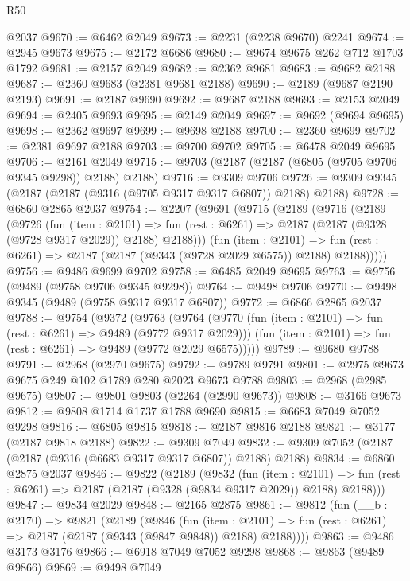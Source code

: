 \begin{lexlean}{R50}
\begin{coremodule}
    @2037
@9670 := @6462 @2049
@9673 := @2231 (@2238 @9670) @2241
@9674 := @2945 @9673
@9675 := @2172 @6686
@9680 := @9674 @9675 @262 @712 @1703 @1792
@9681 := @2157 @2049
@9682 := @2362 @9681
@9683 := @9682 @2188
@9687 := @2360 @9683 (@2381 @9681 @2188)
@9690 := @2189 (@9687 @2190 @2193)
@9691 := @2187 @9690
@9692 := @9687 @2188
@9693 := @2153 @2049
@9694 := @2405 @9693
@9695 := @2149 @2049
@9697 := @9692 (@9694 @9695)
@9698 := @2362 @9697
@9699 := @9698 @2188
@9700 := @2360 @9699
@9702 := @2381 @9697 @2188
@9703 := @9700 @9702
@9705 := @6478 @2049 @9695
@9706 := @2161 @2049
@9715 := @9703 (@2187 (@2187 (@6805 (@9705 @9706 @9345 @9298)) @2188) @2188)
@9716 := @9309 @9706
@9726 := @9309 @9345 (@2187 (@2187 (@9316 (@9705 @9317 @9317 @6807)) @2188) @2188)
@9728 := @6860 @2865 @2037
@9754 := @2207
    (@9691
      (@9715
        (@2189
          (@9716
            (@2189
              (@9726
                (fun (item : @2101) =>
                fun (rest : @6261) => @2187 (@2187 (@9328 (@9728 @9317 @2029)) @2188) @2188)))
            (fun (item : @2101) =>
            fun (rest : @6261) => @2187 (@2187 (@9343 (@9728 @2029 @6575)) @2188) @2188)))))
@9756 := @9486 @9699 @9702
@9758 := @6485 @2049 @9695
@9763 := @9756 (@9489 (@9758 @9706 @9345 @9298))
@9764 := @9498 @9706
@9770 := @9498 @9345 (@9489 (@9758 @9317 @9317 @6807))
@9772 := @6866 @2865 @2037
@9788 := @9754
    (@9372
      (@9763
        (@9764
          (@9770 (fun (item : @2101) => fun (rest : @6261) => @9489 (@9772 @9317 @2029)))
          (fun (item : @2101) => fun (rest : @6261) => @9489 (@9772 @2029 @6575)))))
@9789 := @9680 @9788
@9791 := @2968 (@2970 @9675)
@9792 := @9789 @9791
@9801 := @2975 @9673 @9675 @249 @102 @1789 @280 @2023 @9673 @9788
@9803 := @2968 (@2985 @9675)
@9807 := @9801 @9803 (@2264 (@2990 @9673))
@9808 := @3166 @9673
@9812 := @9808 @1714 @1737 @1788 @9690
@9815 := @6683 @7049 @7052 @9298
@9816 := @6805 @9815
@9818 := @2187 @9816 @2188
@9821 := @3177 (@2187 @9818 @2188)
@9822 := @9309 @7049
@9832 := @9309 @7052 (@2187 (@2187 (@9316 (@6683 @9317 @9317 @6807)) @2188) @2188)
@9834 := @6860 @2875 @2037
@9846 := @9822
    (@2189
      (@9832
        (fun (item : @2101) =>
        fun (rest : @6261) => @2187 (@2187 (@9328 (@9834 @9317 @2029)) @2188) @2188)))
@9847 := @9834 @2029
@9848 := @2165 @2875
@9861 := @9812
    (fun (__b : @2170) =>
    @9821
      (@2189
        (@9846
          (fun (item : @2101) =>
          fun (rest : @6261) => @2187 (@2187 (@9343 (@9847 @9848)) @2188) @2188))))
@9863 := @9486 @3173 @3176
@9866 := @6918 @7049 @7052 @9298
@9868 := @9863 (@9489 @9866)
@9869 := @9498 @7049

\end{coremodule}
\end{lexlean}

